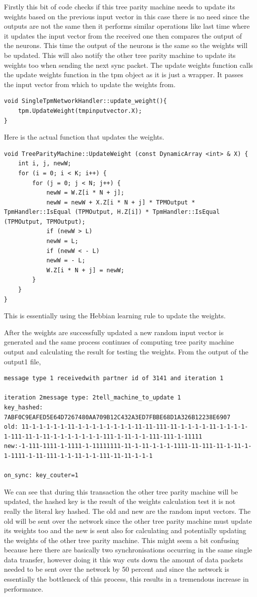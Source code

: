 Firstly this bit of code checks if this tree parity machine needs to update its weights based on the previous input vector in this case there is no need since the outputs are not the same then it performs similar operations like last time where it updates the input vector from the received one then compares the output of the neurons. This time the output of the neurons is the same so the weights will be updated. This will also notify the other tree parity machine to update its weights too when sending the next sync packet. 
The update weights function calls the update weights function in the tpm object as it is just a wrapper. It passes the input vector from which to update the weights from.
\begin{lstlisting}
void SingleTpmNetworkHandler::update_weight(){
	tpm.UpdateWeight(tmpinputvector.X);
}
\end{lstlisting}
Here is the actual function that updates the weights.
\begin{lstlisting}
void TreeParityMachine::UpdateWeight (const DynamicArray <int> & X) {
	int i, j, newW;
	for (i = 0; i < K; i++) {
		for (j = 0; j < N; j++) {
			newW = W.Z[i * N + j];
			newW = newW + X.Z[i * N + j] * TPMOutput * TpmHandler::IsEqual (TPMOutput, H.Z[i]) * TpmHandler::IsEqual (TPMOutput, TPMOutput);
			if (newW > L) 
			newW = L;
			if (newW < - L) 
			newW = - L;
			W.Z[i * N + j] = newW;
		}
	}
}
\end{lstlisting}
This is essentially using the Hebbian learning rule to update the weights.

After the weights are successfully updated a new random input vector is generated and the same process continues of computing tree parity machine output and calculating the result for testing the weights. 
From the output of the output1 file,
\begin{lstlisting}
message type 1 receivedwith partner id of 3141 and iteration 1

iteration 2message type: 2tell_machine_to_update 1
key_hashed: 7ABF0C9EAFED5E64D7267480AA709B12C432A3ED7FBBE68D1A326B12238E6907
old: 11-1-1-1-1-1-11-1-1-1-1-1-1-1-1-11-11-111-11-1-1-1-1-11-1-1-1-1-1-111-11-1-11-1-1-1-1-1-1-1-111-1-11-1-1-111-111-1-11111
new:-1-111-1111-1-1111-1-11111111-11-1-11-1-1-1-1111-11-111-11-1-11-1-1-1111-1-11-111-1-1-11-1-1-111-11-11-1-1-1

on_sync: key_couter=1
\end{lstlisting}
We can see that during this transaction the other tree parity machine will be updated, the hashed key is the result of the weights calculation test it is not really the literal key hashed. The old and new are the random input vectors. The old will be sent over the network since the other tree parity machine must update its weights too and the new is sent also for calculating and potentially updating the weights of the other tree parity machine. This might seem a bit confusing because here there are basically two synchronisations occurring in the same single data transfer, however doing it this way cuts down the amount of data packets needed to be sent over the network by 50 percent and since the network is essentially the bottleneck of this process, this results in a tremendous increase in performance.

